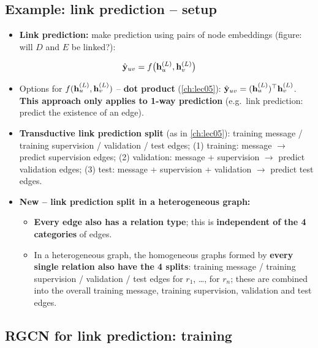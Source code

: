 \subsection{Example: link prediction -- setup}\label{sec:lec09-lpsetup}

\begin{itemize}
  \item \textbf{Link prediction:} make prediction using pairs of node embeddings
    (figure: will $D$ and $E$ be linked?):
\end{itemize}
\begin{equation}\label{eq:lec09-lp}
  \hat{\mathbf{y}}_{uv} = f\big(\mathbf{h}_u^{(L)}, \mathbf{h}_v^{(L)}\big)
\end{equation}
\begin{itemize}
  \item Options for $f(\mathbf{h}_u^{(L)},\mathbf{h}_v^{(L)})$ -- \textbf{dot product}
    (\cref{ch:lec05}):
    $\hat{\mathbf{y}}_{uv} = (\mathbf{h}_u^{(L)})^{\top}\mathbf{h}_v^{(L)}$. \textbf{This approach only
    applies to 1-way prediction} (e.g.\ link prediction: predict the existence of
    an edge).
  \item \textbf{Transductive link prediction split} (as in \cref{ch:lec05}):
    training message / training supervision / validation / test edges; (1)
    training: message $\to$ predict supervision edges; (2) validation: message +
    supervision $\to$ predict validation edges; (3) test: message + supervision
    + validation $\to$ predict test edges.
  \item \textbf{New -- link prediction split in a heterogeneous graph:}
    \begin{itemize}
      \item \textbf{Every edge also has a relation type}; this is
        \textbf{independent of the 4 categories} of edges.
      \item In a heterogeneous graph, the homogeneous graphs formed by
        \textbf{every single relation also have the 4 splits}: training message
        / training supervision / validation / test edges for $r_1$, \dots, for
        $r_n$; these are combined into the overall training message, training
        supervision, validation and test edges.
    \end{itemize}
\end{itemize}

\subsection{RGCN for link prediction: training}\label{sec:lec09-lptrain}

